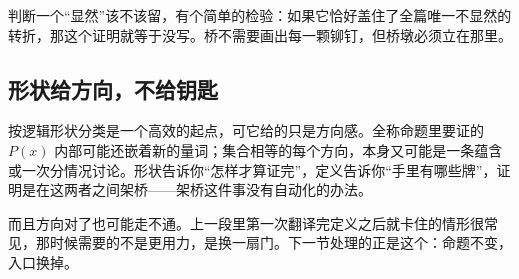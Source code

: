 判断一个``显然''该不该留，有个简单的检验：如果它恰好盖住了全篇唯一不显然的转折，那这个证明就等于没写。桥不需要画出每一颗铆钉，但桥墩必须立在那里。

\subsection{形状给方向，不给钥匙}

按逻辑形状分类是一个高效的起点，可它给的只是方向感。全称命题里要证的 \(P(x)\) 内部可能还嵌着新的量词；集合相等的每个方向，本身又可能是一条蕴含或一次分情况讨论。形状告诉你``怎样才算证完''，定义告诉你``手里有哪些牌''，证明是在这两者之间架桥——架桥这件事没有自动化的办法。

而且方向对了也可能走不通。上一段里第一次翻译完定义之后就卡住的情形很常见，那时候需要的不是更用力，是换一扇门。下一节处理的正是这个：命题不变，入口换掉。
